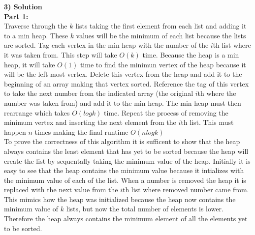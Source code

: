 \documentclass[11pt]{article}
\begin{document}
\textbf{3) Solution}\\
\textbf{Part 1:}\\
Traverse through the $k$ lists taking the first element from each list and adding it to a min heap. These $k$ values will be the minimum of each list because the lists are sorted. Tag each vertex in the min heap with the number of the $i$th list where it was taken from. This step will take $O(k)$ time. Because the heap is a min heap, it will take $O(1)$ time to find the minimun vertex of the heap because it will be the left most vertex. Delete this vertex from the heap and add it to the beginning of an array making that vertex sorted. Reference the tag of this vertex to take the next number from the indicated array (the original $i$th where the number was taken from) and add it to the min heap. The min heap must then rearrange which takes $O(logk)$ time. Repeat the process of removing the minimum vertex and inserting the next element from the $i$th list. This must happen $n$ times making the final runtime $O(nlogk)$\\
To prove the correctness of this algorithm it is sufficent to show that the heap always contains the least element that has yet to be sorted because the heap will create the list by sequentally taking the minimum value of the heap. Initially it is easy to see that the heap contains the minimum value because it intializes with the minimum value of each of the list. When a number is removed the heap it is replaced with the next value from the $i$th list where removed number came from. This mimics how the heap was initialized because the heap now contains the minimum value of $k$ lists, but now the total number of elements is lower. Therefore the heap always contains the minimum element of all the elements yet to be sorted.\\
\end{document}
